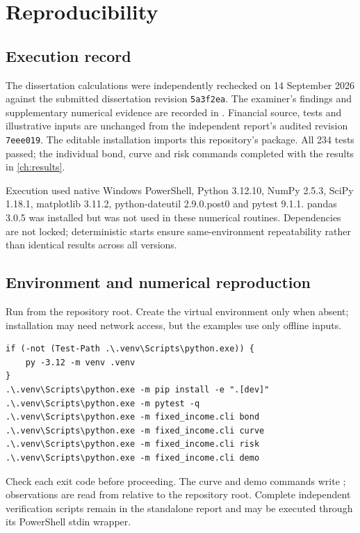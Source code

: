 \chapter{Reproducibility}\label{app:reproducibility}
\section{Execution record}
The dissertation calculations were independently rechecked on 14 September 2026 against the submitted dissertation revision \texttt{5a3f2ea}. The examiner's findings and supplementary numerical evidence are recorded in . Financial source, tests and illustrative inputs are unchanged from the independent report's audited revision \texttt{7eee019}. The editable installation imports this repository's package. All 234 tests passed; the individual bond, curve and risk commands completed with the results in \cref{ch:results}.

Execution used native Windows PowerShell, Python 3.12.10, NumPy 2.5.3, SciPy 1.18.1, matplotlib 3.11.2, python-dateutil 2.9.0.post0 and pytest 9.1.1. pandas 3.0.5 was installed but was not used in these numerical routines. Dependencies are not locked; deterministic starts ensure same-environment repeatability rather than identical results across all versions.

\section{Environment and numerical reproduction}
Run from the repository root. Create the virtual environment only when absent; installation may need network access, but the examples use only offline inputs.
\begingroup\footnotesize
\begin{verbatim}
if (-not (Test-Path .\.venv\Scripts\python.exe)) {
    py -3.12 -m venv .venv
}
.\.venv\Scripts\python.exe -m pip install -e ".[dev]"
.\.venv\Scripts\python.exe -m pytest -q
.\.venv\Scripts\python.exe -m fixed_income.cli bond
.\.venv\Scripts\python.exe -m fixed_income.cli curve
.\.venv\Scripts\python.exe -m fixed_income.cli risk
.\.venv\Scripts\python.exe -m fixed_income.cli demo
\end{verbatim}
\endgroup
Check each exit code before proceeding. The curve and demo commands write ; observations are read from  relative to the repository root. Complete independent verification scripts remain in the standalone report and may be executed through its PowerShell stdin wrapper.


